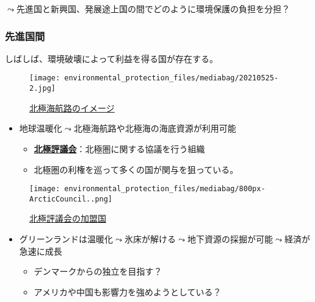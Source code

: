 \documentclass[
  xelatex,
  ja=standard]{bxjsarticle}
\providecommand{\tightlist}{%
  \setlength{\itemsep}{0pt}\setlength{\parskip}{0pt}}\usepackage{longtable,booktabs,array}
\begin{document}
\(\leadsto\)先進国と新興国、発展途上国の間でどのように環境保護の負担を分担？

\hypertarget{ux5148ux9032ux56fdux9593}{%
\subsubsection{先進国間}\label{ux5148ux9032ux56fdux9593}}

しばしば、環境破壊によって利益を得る国が存在する。

\begin{figure}[htpb]

{\centering \texttt{[image: environmental\_protection\_files/mediabag/20210525-2.jpg]}

}

\caption{\href{https://financial.jiji.com/magazine_bk/back_number.html?number=155}{北極海航路のイメージ}}

\end{figure}

\begin{itemize}
\tightlist
\item
  地球温暖化\(\leadsto\)北極海航路や北極海の海底資源が利用可能

  \begin{itemize}
  \tightlist
  \item
    \href{https://www.mofa.go.jp/mofaj/area/arctic/hokkyoku_hyougikai.html}{\textbf{北極評議会}}：北極圏に関する協議を行う組織
  \item
    北極圏の利権を巡って多くの国が関与を狙っている。
  \end{itemize}
\end{itemize}

\begin{figure}[htpb]

{\centering \texttt{[image: environmental\_protection\_files/mediabag/800px-ArcticCouncil..png]}

}

\caption{\href{https://commons.wikimedia.org/wiki/File:ArcticCouncil.svg}{北極評議会の加盟国}}

\end{figure}

\begin{itemize}
\tightlist
\item
  グリーンランドは温暖化\(\leadsto\)氷床が解ける\(\leadsto\)地下資源の採掘が可能\(\leadsto\)経済が急速に成長

  \begin{itemize}
  \tightlist
  \item
    デンマークからの独立を目指す？
  \item
    アメリカや中国も影響力を強めようとしている？
  \end{itemize}
\end{itemize}
\end{document}
